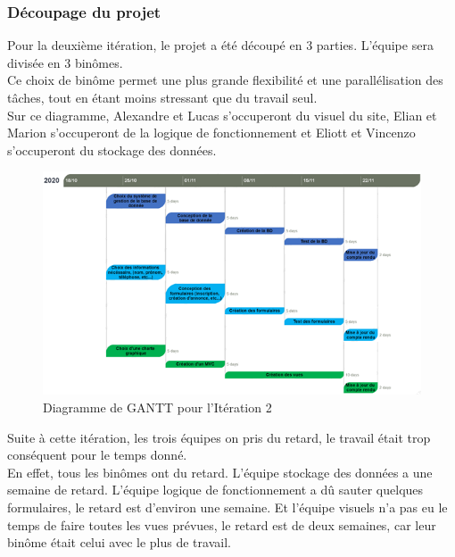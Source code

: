 \documentclass[a4paper,11pt]{article}
\begin{document}
\subsubsection{Découpage du projet}

Pour la deuxième itération, le projet a été découpé en 3 parties. L’équipe sera divisée en 3 binômes.\\

Ce choix de binôme permet une plus grande flexibilité et une parallélisation des tâches, tout en étant
moins stressant que du travail seul.\\

Sur ce diagramme, Alexandre et Lucas s'occuperont du visuel du site,
Elian et Marion s'occuperont de la logique de fonctionnement et
Eliott et Vincenzo s'occuperont du stockage des données.\\

\begin{figure}[H]
  \includegraphics[width=\linewidth]{images/gantt-iteration2.png}
  \caption{Diagramme de GANTT pour l'Itération 2}
  \label{fig:gantt-iteration2}
\end{figure}

Suite à cette itération, les trois équipes on pris du retard, le travail était trop conséquent pour le temps donné.\\
En effet, tous les binômes ont du retard. L'équipe stockage des données a une semaine de retard.
L'équipe logique de fonctionnement a dû sauter quelques formulaires, le retard est d'environ une semaine.
Et l'équipe visuels n'a pas eu le temps de faire toutes les vues prévues, le retard est de deux semaines, car leur binôme était celui avec le plus de travail.
\end{document}
